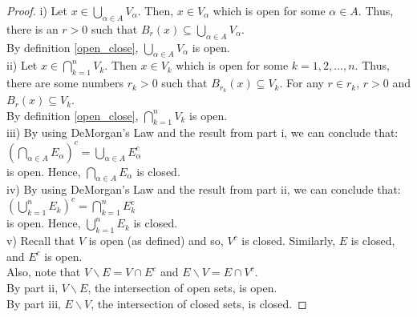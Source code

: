 \documentclass[12pt, reqno]{amsart}
\theoremstyle{definition}
\numberwithin{equation}{section}
\begin{document}
\begin{proof}
i) Let $x \in \bigcup_{\alpha \in A}V_\alpha$. Then, $x \in V_\alpha$ which is open for some $\alpha \in A$. Thus, there is an $r>0$ such that $B_r(x) \subseteq {\bigcup_{\alpha \in A}V_\alpha}$.\\
By definition \ref{open_close}, $\bigcup_{\alpha \in A}V_\alpha$ is open.\\
ii) Let $x \in \bigcap_{k=1}^{n}V_k$. Then $x \in V_k$ which is open for some $k =1,2,...,n$. Thus, there are some numbers $r_k > 0$ such that $B_{r_k}(x) \subseteq V_k$. For any $r \in r_k$, $r>0$ and $B_r(x) \subseteq V_k$.\\
By definition \ref{open_close}, $\bigcap_{k=1}^{n}V_k$ is open.\\
iii) By using DeMorgan's Law and the result from part i, we can conclude that:\\
\hspace*{6cm} $(\bigcap_{\alpha \in A}E_\alpha)^c = \bigcup_{\alpha \in A}E_\alpha^c$\\ 
is open. Hence, $\bigcap_{\alpha \in A}E_\alpha$ is closed.\\
iv) By using DeMorgan's Law and the result from part ii, we can conclude that:\\
\hspace*{6cm} $(\bigcup_{k=1}^{n}E_k)^c = \bigcap_{k=1}^{n}E_k^c$\\
is open. Hence, $\bigcup_{k=1}^{n}E_k$ is closed.\\
v) Recall that $V$ is open (as defined) and so, $V^c$ is closed. Similarly, $E$ is closed, and $E^c$ is open.\\
Also, note that $V \backslash E = V \cap E^c$ and $E \backslash V = E \cap V^c$.\\
By part ii, $V \backslash E$, the intersection of open sets, is open.\\
By part iii, $E \backslash V$, the intersection of closed sets, is closed.
\end{proof}
\end{document}
